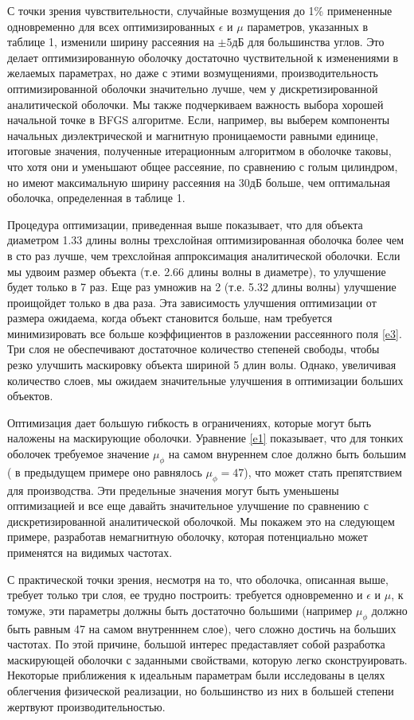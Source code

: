 \documentclass[a4paper, 12pt]{article}
\begin{document}
С точки зрения чувствительности, случайные возмущения до 1\% примененные 
одновременно для всех оптимизированных $\epsilon$ и $\mu$ параметров,
указанных в таблице 1, изменили ширину рассеяния на $\pm5$дБ для большинства углов.
Это делает оптимизированную оболочку достаточно чуствительной к изменениями
в желаемых параметрах, но даже с этими возмущениями, производительность
оптимизированной оболочки значительно лучше, чем у дискретизированной
аналитической оболочки. Мы также подчеркиваем важность выбора хорошей
начальной точке в BFGS алгоритме. Если, например, вы выберем
компоненты начальных диэлектрической и магнитную проницаемости
равными единице, итоговые значения, полученные итерационным алгоритмом в оболочке
таковы, что хотя они и  уменьшают общее рассеяние, по сравнению с голым цилиндром,
но имеют максимальную ширину рассеяния на 30дБ больше, чем оптимальная оболочка,
определенная в таблице 1.

Процедура оптимизации, приведенная выше показывает, что для объекта диаметром
1.33 длины волны трехслойная оптимизированная оболочка более чем в сто раз 
лучше, чем трехслойная аппроксимация аналитической оболочки. Если мы 
удвоим размер объекта (т.е. 2.66 длины волны в диаметре), то улучшение будет
только в 7 раз. Еще раз умножив на 2 (т.е. 5.32 длины волны) улучшение
проищойдет только в два раза. Эта зависимость улучшения оптимизации от
размера ожидаема, когда объект становится больше, нам требуется 
минимизировать все больше коэффициентов в разложении рассеянного поля \eqref{e3}.
Три слоя не обеспечивают достаточное количество степеней свободы, чтобы
резко улучшить маскировку объекта шириной 5 длин волы. Однако, увеличивая
количество слоев, мы ожидаем значительные улучшения в оптимизации 
больших объектов.

Оптимизация дает большую гибкость в ограничениях, которые могут быть наложены на
маскирующие оболочки. Уравнение \eqref{e1} показывает, что для тонких оболочек
требуемое значение $\mu_\phi$ на самом внуреннем слое должно быть большим (
в предыдущем примере оно равнялось $\mu_\phi=47$), что может стать
препятствием для производства. Эти предельные значения могут быть уменьшены
оптимизацией и все еще давайть значительное улучшение по сравнению с 
дискретизированной аналитической оболочкой. Мы покажем это на следующем примере,
разработав немагнитную оболочку, которая потенциально может применятся
на видимых частотах.

С практической точки зрения, несмотря на то, что оболочка, описанная выше, требует только три слоя, ее трудно построить: требуется одновременно и 
$\epsilon$ и $\mu$, к томуже, эти параметры должны быть достаточно большими
(например $\mu_\phi$ должно быть равным 47 на самом внутренннем слое), чего сложно
достичь на больших частотах. По этой причине, большой интерес предаставляет 
собой разработка маскирующей оболочки с заданными свойствами, которую легко
сконструировать. Некоторые приближения к идеальным параметрам были исследованы 
\cite{2,5} в целях облегчения физической реализации, но большинство из
них в большей степени жертвуют производительностью.
\end{document}
